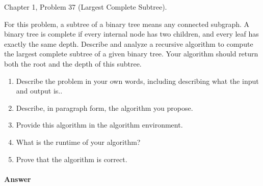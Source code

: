 \documentclass{article}
\begin{document}

\nextprob
{}

Chapter 1, Problem 37 (Largest Complete Subtree).

For this problem, a subtree of a binary tree means any connected subgraph.
A binary tree is complete if every internal node has two children, and every leaf has exactly the same depth.
Describe and analyze a recursive algorithm to compute the largest complete subtree of a given binary tree.
Your algorithm should return both the root and the depth of this subtree.


\begin{enumerate}
    \item Describe the problem in your own words, including
        describing what the input and output is..
    \item Describe, in paragraph form, the algorithm you propose.
    \item Provide this algorithm in the algorithm environment.
    \item What is the runtime of your algorithm?
    \item Prove that the algorithm is correct.
\end{enumerate}

\paragraph{Answer}

\end{document}
